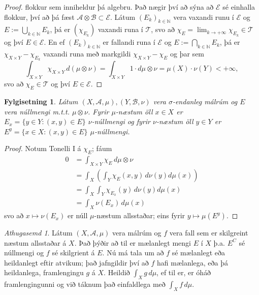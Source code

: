 \documentclass[a4paper,icelandic,11pt]{book}
\theoremstyle{plain}      \newtheorem{setn}{Setning}[chapter]
\newtheorem{fylgi}[setn]{Fylgisetning}
\theoremstyle{definition} \newtheorem{skilgr}[setn]{Skilgreining}
\theoremstyle{remark}     \newtheorem*{ath}{Athugasemd}
\newcommand{\N}{\mathbb N}
\begin{document}
\begin{proof}
  flokkur sem inniheldur þá algebru. Það nægir því að sýna að
  $\mathcal E$ sé einhalla flokkur, því að þá fæst $\mathcal
  A\otimes\mathcal B \subset\mathcal E$. Látum $(E_{k})_{k\in\N}$ vera
  vaxandi runu í $\mathcal E$ og $E:=\bigcup_{k\in\N}E_{k}$, þá er
  $(\chi_{E_{k}})$ vaxandi runa í $\mathcal T$, svo að $\chi_{E} =
  \lim_{k\to +\infty}\chi_{E_{k}}\in\mathcal T$ og því $E\in\mathcal
  E$. En ef $(E_{k})_{k\in\N}$ er fallandi runa í $\mathcal E$ og
  $E:=\bigcap_{k\in\N}E_{k}$, þá er $\chi_{X\times Y}-\chi_{E_{k}}$
  vaxandi runa með markgildi $\chi_{X\times Y}-\chi_{E}$ og þar sem 
  \[
  \int_{X\times Y}\chi_{X\times Y}\,d(\mu\otimes\nu)
  = \int_{X\times Y} 1\cdot d\mu\otimes\nu
  = \mu(X)\cdot\nu(Y)
  < +\infty,
  \]
  svo að $\chi_{E}\in\mathcal T$ og því $E\in\mathcal E$.
\end{proof}
\begin{fylgi}
  Látum $(X,\mathcal A,\mu), (Y,\mathcal B,\nu)$ vera
  $\sigma$-endanleg málrúm og $E$ vera núllmengi
  m.t.t. $\mu\otimes\nu$. Fyrir $\mu$-næstum öll $x\in X$ er $E_{x}=\{
  y\in Y : (x,y)\in E \}$ $\nu$-núllmengi og fyrir $\nu$-næstum öll
  $y\in Y$ er $E^{y} = \{ x\in X : (x,y) \in E \}$ $\mu$-núllmengi.
\end{fylgi}
\begin{proof}
  Notum Tonelli I á $\chi_{E}$; fáum
  \begin{align*}
    0
    &= \int_{X\times Y} \chi_{E}\,d\mu\otimes\nu
    \\
    &= \int_{X}\left(
      \int_{Y} \chi_{E}(x,y)\,d\nu(y)d\mu(x)
    \right)
    \\
    &= \int_{X}\int_{Y}\chi_{E_{x}}(y)\,d\nu(y)d\mu(x)
    \\
    &= \int_{X}\nu(E_{x})\,d\mu(x)
  \end{align*}
  svo að $x\mapsto\nu(E_{x})$ er núll $\mu$-næstum allsstaðar; eins
  fyrir $y\mapsto \mu(E^{y})$.
\end{proof}
\begin{ath}
  Látum $(X,\mathcal A,\mu)$ vera málrúm og $f$ vera fall sem er
  skilgreint næstum allsstaðar á $X$. Það þýðir að til er mælanlegt
  mengi $E$ í $X$ þ.a. $E^{C}$ sé núllmengi og $f$ sé skilgrient á
  $E$. Nú má tala um að $f$ sé mælanlegt eða heildanlegt eftir
  atvikum; það jafngildir því að $f$ hafi mælanlega, eða þá
  heildanlega, framlengingu $g$ á $X$. Heildið $\int_{X}g\,d\mu$, ef
  til er, er óháð framlengingunni og við táknum það einfaldlega með
  $\int_{X}f\,d\mu$.
\end{ath}
\end{document}

